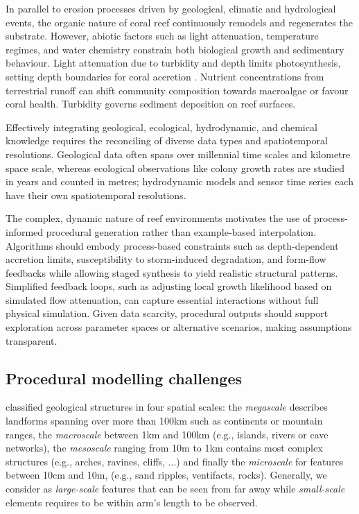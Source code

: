 In parallel to erosion processes driven by geological, climatic and hydrological events, the organic nature of coral reef continuously remodels and regenerates the substrate. However, abiotic factors such as light attenuation, temperature regimes, and water chemistry constrain both biological growth and sedimentary behaviour. Light attenuation due to turbidity and depth limits photosynthesis, setting depth boundaries for coral accretion \cite{Kirk1994}. Nutrient concentrations from terrestrial runoff can shift community composition towards macroalgae or favour coral health. Turbidity governs sediment deposition on reef surfaces.

Effectively integrating geological, ecological, hydrodynamic, and chemical knowledge requires the reconciling of diverse data types and spatiotemporal resolutions. Geological data often spans over millennial time scales and kilometre space scale, whereas ecological observations like colony growth rates are studied in years and counted in metres; hydrodynamic models and sensor time series each have their own spatiotemporal resolutions.

The complex, dynamic nature of reef environments motivates the use of process-informed procedural generation rather than example-based interpolation. Algorithms should embody process-based constraints such as depth-dependent accretion limits, susceptibility to storm-induced degradation, and form-flow feedbacks while allowing staged synthesis to yield realistic structural patterns. Simplified feedback loops, such as adjusting local growth likelihood based on simulated flow attenuation, can capture essential interactions without full physical simulation. Given data scarcity, procedural outputs should support exploration across parameter spaces or alternative scenarios, making assumptions transparent.

\subsection{Procedural modelling challenges}
\cite{ParisThesis} classified geological structures in four spatial scales: the \emph{megascale} describes landforms spanning over more than 100km such as continents or mountain ranges, the \emph{macroscale} between 1km and 100km (e.g., islands, rivers or cave networks), the \emph{mesoscale} ranging from 10m to 1km contains most complex structures (e.g., arches, ravines, cliffs, ...) and finally the \emph{microscale} for features between 10cm and 10m, (e.g., sand ripples, ventifacts, rocks). Generally, we consider as \emph{large-scale} features that can be seen from far away while \emph{small-scale} elements requires to be within arm's length to be observed.

